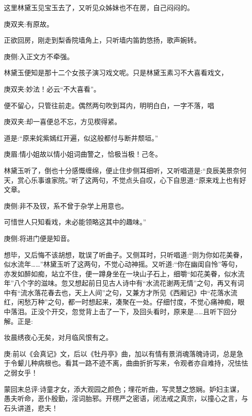 \begin{parag}
    这里林黛玉见宝玉去了，又听见众姊妹也不在房，自己闷闷的。\begin{note}庚双夹:有原故。\end{note}正欲回房，刚走到梨香院墙角上，只听墙内笛韵悠扬，歌声婉转。\begin{note}庚侧:入正文方不牵强。\end{note}林黛玉便知是那十二个女孩子演习戏文呢。只是林黛玉素习不大喜看戏文，\begin{note}庚双夹:妙法！必云“不大喜看”。\end{note}便不留心，只管往前走。偶然两句吹到耳内，明明白白，一字不落，唱\begin{note}庚双夹:却一喜便总不忘，方见楔得紧。\end{note}道是:“原来姹紫嫣红开遍，似这般都付与断井颓垣。”\begin{note}庚眉:情小姐故以情小姐词曲警之，恰极当极！己冬。\end{note}林黛玉听了，倒也十分感慨缠绵，便止住步侧耳细听，又听唱道是:“良辰美景奈何天，赏心乐事谁家院。”听了这两句，不觉点头自叹，心下自思道:“原来戏上也有好文章。\begin{note}庚侧:非不及钗，系不曾于杂学上用意也。\end{note}可惜世人只知看戏，未必能领略这其中的趣味。”\begin{note}庚侧:将进门便是知音。\end{note}想毕，又后悔不该胡想，耽误了听曲子。又侧耳时，只听唱道:“则为你如花美眷，似水流年……”林黛玉听了这两句，不觉心动神摇。又听道:“你在幽闺自怜”等句，亦发如醉如痴，站立不住，便一蹲身坐在一块山子石上，细嚼“如花美眷，似水流年”八个字的滋味。忽又想起前日见古人诗中有“水流花谢两无情”之句，再又有词中有“流水落花春去也，天上人间”之句，又兼方才所见《西厢记》中“花落水流红，闲愁万种”之句，都一时想起来，凑聚在一处。仔细忖度，不觉心痛神痴，眼中落泪。正没个开交，忽觉背上击了一下，及回头看时，原来是……且听下回分解。正是:
\end{parag}


\begin{poem}
    \begin{pl}妆晨绣夜心无矣，对月临风恨有之。\end{pl}
\end{poem}


\begin{parag}
    \begin{note}庚:前以《会真记》文，后以《牡丹亭》曲，加以有情有景消魂落魄诗词，总是急于令颦儿种病根也。看其一路不迹不离，曲曲折折写来，令观者亦自难持，况怯怯之弱女乎！\end{note}
\end{parag}


\begin{parag}
    \begin{note}蒙回末总评:诗童才女，添大观园之颜色；埋花听曲，写灵慧之悠娴。妒妇主谋，愚夫听命，恶仆殷勤，淫词胎邪。开楞严之密语，闭法戒之真宗，以撞心之言，与石头讲道，悲夫！\end{note}
\end{parag}